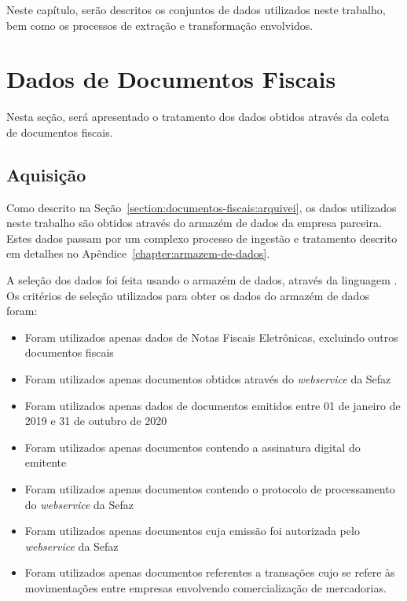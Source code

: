 
Neste capítulo, serão descritos os conjuntos de dados utilizados neste trabalho, bem como os processos de extração e transformação envolvidos.

\section{Dados de Documentos Fiscais}
\label{section:base-de-dados:dados-de-documentos-fiscais}

Nesta seção, será apresentado o tratamento dos dados obtidos através da coleta de documentos fiscais.

\subsection{Aquisição}
\label{section:base-de-dados:dados-de-documentos-fiscais:aquisicao}

Como descrito na Seção~\ref{section:documentos-fiscais:arquivei}, os dados utilizados neste trabalho são obtidos através do armazém de dados da empresa parceira. Estes dados passam por um complexo processo de ingestão e tratamento descrito em detalhes no Apêndice~\ref{chapter:armazem-de-dados}.

A seleção dos dados foi feita usando o armazém de dados, através da linguagem . Os critérios de seleção utilizados para obter os dados do armazém de dados foram:

\begin{itemize}
    \item Foram utilizados apenas dados de Notas Fiscais Eletrônicas, excluindo outros documentos fiscais
    \item Foram utilizados apenas documentos obtidos através do \textit{webservice} da Sefaz
    \item Foram utilizados apenas dados de documentos emitidos entre 01 de janeiro de 2019 e 31 de outubro de 2020
    \item Foram utilizados apenas documentos contendo a assinatura digital do emitente
    \item Foram utilizados apenas documentos contendo o protocolo de processamento do \textit{webservice} da Sefaz
    \item Foram utilizados apenas documentos cuja emissão foi autorizada pelo \textit{webservice} da Sefaz
    \item Foram utilizados apenas documentos referentes a transações cujo  se refere às movimentações entre empresas envolvendo comercialização de mercadorias.
\end{itemize}


